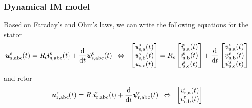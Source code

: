 \begin{frame}
	\frametitle{Dynamical IM model}
    Based on Faraday's and Ohm's laws, we can write the following equations for the stator 
    \begin{equation}
            \bm{u}^\mathrm{s}_\mathrm{s,abc}(t) = R_\mathrm{s}\bm{i}^\mathrm{s}_\mathrm{s,abc}(t)+\frac{\mathrm{d}}{\mathrm{d}t}\bm{\psi}^\mathrm{s}_\mathrm{s,abc}(t) \hspace{0.2cm} \Leftrightarrow \hspace{0.2cm} \begin{bmatrix}
                u_{\mathrm{s,a}}^\mathrm{s}(t)\\
                u_{\mathrm{s,b}}^\mathrm{s}(t)\\
                u_{\mathrm{s,c}}(t)\\
            \end{bmatrix} = R_\mathrm{s} \begin{bmatrix}
                i_{\mathrm{s,a}}^\mathrm{s}(t)\\
                i_{\mathrm{s,b}}^\mathrm{s}(t)\\
                i_{\mathrm{s,c}}^\mathrm{s}(t)\\
            \end{bmatrix} + \frac{\mathrm{d}}{\mathrm{d}t} \begin{bmatrix}
                \psi_{\mathrm{s,a}}^\mathrm{s}(t)\\
                \psi_{\mathrm{s,b}}^\mathrm{s}(t)\\
                \psi_{\mathrm{s,c}}^\mathrm{s}(t)\\
            \end{bmatrix}
            \label{eq:IM_stator_three_phase_voltage_equation}
    \end{equation}
    and rotor
    \begin{equation}
            \bm{u}^\mathrm{r}_\mathrm{r,abc}(t) = R_\mathrm{r}\bm{i}^\mathrm{r}_\mathrm{r,abc}(t)+\frac{\mathrm{d}}{\mathrm{d}t}\bm{\psi}^\mathrm{r}_\mathrm{r,abc}(t) \hspace{0.2cm} \Leftrightarrow \hspace{0.2cm} \begin{bmatrix}
                u_{\mathrm{r,a}}^\mathrm{r}(t)\\
                u_{\mathrm{r,b}}^\mathrm{r}(t)\\

\end{bmatrix}
\end{equation}
\end{frame}
